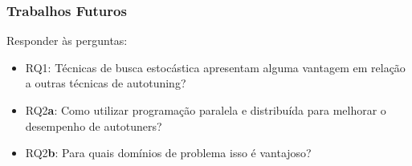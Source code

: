 \documentclass[10pt, compress]{beamer}
\begin{document}
\begin{frame}[fragile]
    \frametitle{Trabalhos Futuros}
    Responder às perguntas:
    \begin{itemize}
        \item \alert{RQ1}: Técnicas de busca estocástica apresentam
            alguma vantagem em relação a outras técnicas de autotuning?
        \item \alert{RQ2\textbf{a}}: Como utilizar programação paralela e
            distribuída para melhorar o desempenho de autotuners?
        \item \alert{RQ2\textbf{b}}: Para quais domínios de problema isso é
            vantajoso?
    \end{itemize}
\end{frame}


\maketitle
\end{document}
